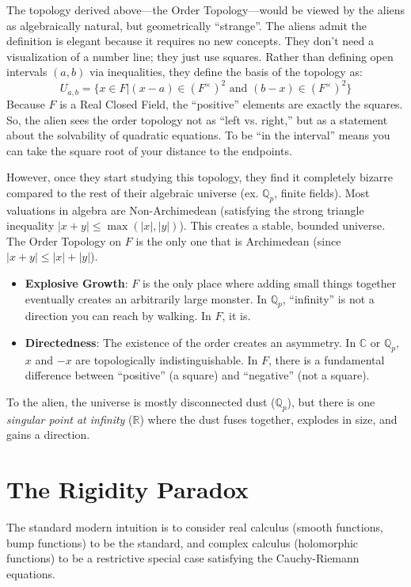 \documentclass{article}
\newcommand{\C}{{\mathbb{C}}}
\newcommand{\Q}{{\mathbb{Q}}}
\newcommand{\R}{{\mathbb{R}}}
\renewcommand{\mid}{\big|}
\begin{document}
The topology derived above---the Order Topology---would be viewed by the aliens as algebraically natural, but
geometrically ``strange''. The aliens admit the definition is elegant because it requires no new concepts.
They don't need a visualization of a number line; they just use squares.
Rather than defining open intervals $(a,b)$ via inequalities, they define the basis of the topology as:
\[
U_{a,b} = \{ x \in F \mid (x-a) \in (F^\times)^2 \text{ and } (b-x) \in (F^\times)^2 \}
\]
Because $F$ is a Real Closed Field, the ``positive'' elements are exactly the squares. So, the alien sees the
order topology not as ``left vs. right,'' but as a statement about the solvability of quadratic equations. To be ``in the interval'' means you can take the square root of your distance to the endpoints.

However, once they start studying this topology, they find it completely bizarre compared to the rest of their
algebraic universe (ex. $\Q_p$, finite fields). Most valuations in algebra are Non-Archimedean
(satisfying the strong triangle inequality $|x+y| \le \max(|x|, |y|)$). This creates a stable, bounded
universe. The Order Topology on $F$ is the only one that is Archimedean (since $|x+y| \le |x| + |y|$).

\begin{itemize}
    \item \textbf{Explosive Growth}: $F$ is the only place where adding small things together eventually creates an arbitrarily large monster. In $\Q_p$, ``infinity'' is not a direction you can reach by walking. In $F$, it is.
    \item \textbf{Directedness}: The existence of the order creates an asymmetry. In $\C$ or $\Q_p$, $x$ and $-x$ are topologically indistinguishable. In $F$, there is a fundamental difference between ``positive'' (a square) and ``negative'' (not a square).
\end{itemize}

To the alien, the universe is mostly disconnected dust ($\Q_p$), but there is one \emph{singular point at infinity} ($\R$) where the dust fuses together, explodes in size, and gains a direction.

\section{The Rigidity Paradox}

The standard modern intuition is to consider real calculus (smooth functions, bump functions) to be the standard, and complex calculus (holomorphic functions) to be a restrictive special case satisfying the Cauchy-Riemann equations.
\end{document}
